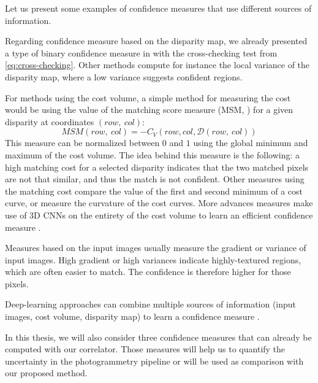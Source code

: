 \begin{example}
    Let us present some examples of confidence measures that use different sources of information.
    
    Regarding confidence measure based on the disparity map, we already presented a type of binary confidence measure in  with the cross-checking test from \cref{eq:cross-checking}. Other methods compute for instance the local variance of the disparity map, where a low variance suggests confident regions.
    
    For methods using the cost volume, a simple method for measuring the cost would be using the value of the matching score measure (MSM, \cite{egnal_stereo_2004}) for a given disparity at coordinates $(row, ~col)$:
    \begin{equation}
        MSM(row, ~col) = -C_V(row, col, \mathcal{D}(row, ~col))
    \end{equation}
    This measure can be normalized between $0$ and $1$ using the global minimum and maximum of the cost volume. The idea behind this measure is the following: a high matching cost for a selected disparity indicates that the two matched pixels are not that similar, and thus the match is not confident. Other measures using the matching cost compare the value of the first and second minimum of a cost curve, or measure the curvature of the cost curves. More advances measures make use of 3D CNNs on the entirety of the cost volume to learn an efficient confidence measure \cite{mehltretter_cnn-based_2019}.
    
    Measures based on the input images usually measure the gradient \cite{haeusler_ensemble_2013} or variance \cite{park_learning_2019} of input images. High gradient or high variances indicate highly-textured regions, which are often easier to match. The confidence is therefore higher for those pixels. 
    
    Deep-learning approaches can combine multiple sources of information (input images, cost volume, disparity map) to learn a confidence measure \cite{tosi_beyond_2018, kim_adversarial_2020}.
\end{example}

In this thesis, we will also consider three confidence measures that can already be computed with our correlator. Those measures will help us to quantify the uncertainty in the photogrammetry pipeline or will be used as comparison with our proposed method.

